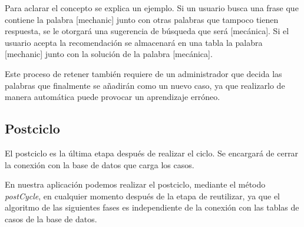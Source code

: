 Para aclarar el concepto se explica un ejemplo. Si un usuario busca una frase que contiene la palabra [mechanic] junto con otras palabras que tampoco tienen respuesta, se le otorgará una sugerencia de búsqueda que será [mecánica]. Si el usuario acepta la recomendación se almacenará en una tabla la palabra [mechanic] junto con la solución de la palabra [mecánica].

Este proceso de retener también requiere de un administrador que decida las palabras que finalmente se añadirán como un nuevo caso, ya que realizarlo de manera automática puede provocar un aprendizaje erróneo.


\subsection{Postciclo}\label{postciclo}

El postciclo es la última etapa después de realizar el ciclo. Se encargará de cerrar la conexión con la base de datos que carga los casos.

En nuestra aplicación podemos realizar el postciclo, mediante el método \emph{postCycle}, en cualquier momento después de la etapa de reutilizar, ya que el algoritmo de las siguientes fases es independiente de la conexión con las tablas de casos de la base de datos.